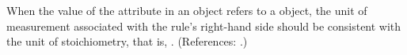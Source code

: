 When the value of the attribute  in an \AssignmentRule
object refers to a \SpeciesReference object, the unit of measurement
associated with the rule's right-hand side should be consistent with the
unit of stoichiometry, that is, .  (References: .)
